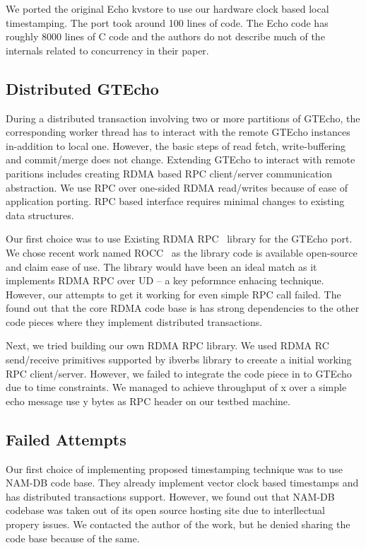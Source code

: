 We ported the original Echo kvstore to use our hardware clock based local timestamping. The  port took around 100 lines
of code. The Echo code has roughly 8000 lines of C code and the authors do not describe much of the internals related to
concurrency in their paper.

\subsection{Distributed GTEcho}

During a distributed transaction involving two or more partitions of GTEcho, the corresponding worker thread has to 
interact with the remote GTEcho instances in-addition to local one. However, the basic steps of read fetch, write-buffering
and commit/merge does not change. Extending GTEcho to interact with remote paritions includes creating RDMA based RPC 
client/server communication abstraction. We use RPC over one-sided RDMA read/writes because of ease of application porting.
RPC based interface requires minimal changes to existing data structures.

Our first choice was to use Existing RDMA RPC~\cite{drtmh} library for the GTEcho port. We chose recent work named ROCC~\cite{rocc} 
as the library code is available open-source and claim ease of use. The library would have been an ideal match as it
implements RDMA RPC over UD -- a key peformnce enhacing technique. However, our attempts to get it working for even
simple RPC call failed. The found out that the core RDMA code base is has strong dependencies to the other code pieces
where they implement distributed transactions. 

Next, we tried building our own RDMA RPC library. We used RDMA RC send/receive primitives supported by ibverbs 
library to creeate a initial working RPC client/server. However, we failed to integrate the code piece in to GTEcho
due to time constraints. We managed to achieve throughput of x over a simple echo message use y bytes as RPC header
on our testbed machine.

\subsection{Failed Attempts}

Our first choice of implementing proposed timestamping technique was to use NAM-DB code base. They already
implement vector clock based timestamps and has distributed transactions support. However, we found out
that NAM-DB codebase was taken out of its open source hosting site due to interllectual propery issues.
We contacted the author of the work, but he denied sharing the code base because of the same.

